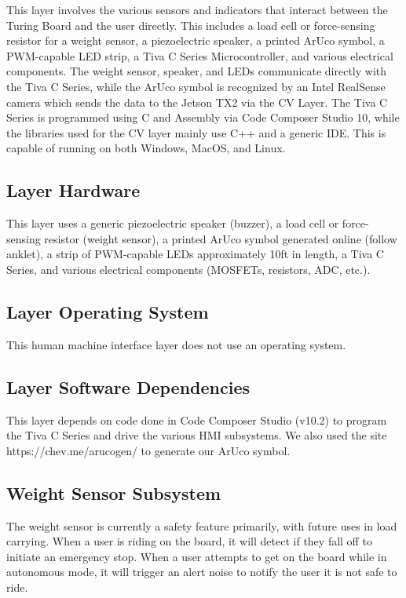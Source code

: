 This layer involves the various sensors and indicators that interact between the Turing Board and the user directly. This includes a load cell or force-sensing resistor for a weight sensor, a piezoelectric speaker, a printed ArUco symbol, a PWM-capable LED strip, a Tiva C Series Microcontroller, and various electrical components. The weight sensor, speaker, and LEDs communicate directly with the Tiva C Series, while the ArUco symbol is recognized by an Intel RealSense camera which sends the data to the Jetson TX2 via the CV Layer. The Tiva C Series is programmed using C and Assembly via Code Composer Studio 10, while the libraries used for the CV layer mainly use C++ and a generic IDE. This is capable of running on both Windows, MacOS, and Linux.

\subsection{Layer Hardware}
This layer uses a generic piezoelectric speaker (buzzer), a load cell or force-sensing resistor (weight sensor), a printed ArUco symbol generated online (follow anklet), a strip of PWM-capable LEDs approximately 10ft in length, a Tiva C Series, and various electrical components (MOSFETs, resistors, ADC, etc.).

\subsection{Layer Operating System}
This human machine interface layer does not use an operating system. 

\subsection{Layer Software Dependencies}
This layer depends on code done in Code Composer Studio (v10.2) to program the Tiva C Series and drive the various HMI subsystems. We also used the site https://chev.me/arucogen/ to generate our ArUco symbol.

\subsection{Weight Sensor Subsystem}
The weight sensor is currently a safety feature primarily, with future uses in load carrying. When a user is riding on the board, it will detect if they fall off to initiate an emergency stop. When a user attempts to get on the board while in autonomous mode, it will trigger an alert noise to notify the user it is not safe to ride.

